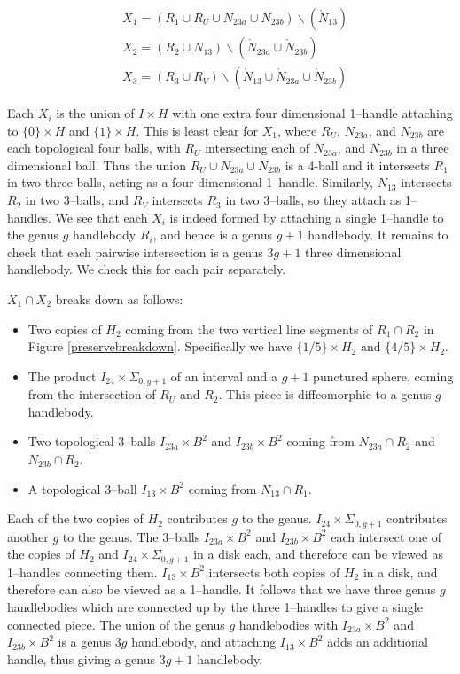 \documentclass[12pt]{amsart}
\theoremstyle{definition}
\theoremstyle{remark}
\begin{document}
\begin{align*}
&X_1 = (R_1 \cup R_U \cup N_{23a} \cup N_{23b}) \backslash (\mathring N_{13}) \\
&X_2 = (R_2 \cup N_{13}) \backslash (\mathring N_{23a} \cup \mathring N_{23b}) \\
&X_3 = (R_3 \cup R_V) \backslash (\mathring N_{13} \cup \mathring N_{23a} \cup \mathring N_{23b}) 
\end{align*}

Each $X_i$ is the union of $I \times H$ with one extra four dimensional 1--handle attaching to $\{0\} \times H$ and $\{1\} \times H$.  This is least clear for $X_1$, where $R_U$, $N_{23a}$, and $N_{23b}$ are each topological four balls, with $R_U$ intersecting each of $N_{23a}$, and $N_{23b}$ in a three dimensional ball.  Thus the union $R_U \cup N_{23a} \cup N_{23b}$ is a 4-ball and it intersects $R_1$ in two three balls, acting as a four dimensional 1--handle.  Similarly, $N_{13}$ intersects $R_2$ in two 3--balls, and $R_V$ intersects $R_3$ in two 3--balls, so they attach as 1--handles.   We see that each $X_i$ is indeed formed by attaching a single 1--handle to the genus $g$ handlebody $R_i$, and hence is a genus $g+1$ handlebody.  It remains to check that each pairwise intersection is a genus $3g+1$ three dimensional handlebody.  We check this for each pair separately.

$X_1 \cap X_2$ breaks down as follows:

\begin{itemize}
\item Two copies of $H_2$ coming from the two vertical line segments of $R_1 \cap R_2$ in Figure \ref{preservebreakdown}.  Specifically we have $\{1/5\} \times H_2$ and $\{4/5\} \times H_2$.
\item The product $I_{24} \times \Sigma_{0,g+1}$ of an interval and a $g+1$ punctured sphere, coming from the intersection of $R_U$ and $R_2$.  This piece is diffeomorphic to a genus $g$ handlebody.
\item Two topological 3--balls $I_{23a} \times B^2$ and $I_{23b} \times B^2$ coming from $N_{23a} \cap R_2$ and $N_{23b} \cap R_2$.
\item A topological 3--ball $I_{13} \times B^2$ coming from $N_{13} \cap R_1$.
\end{itemize}

Each of the two copies of $H_2$ contributes $g$ to the genus.  $I_{24} \times \Sigma_{0,g+1}$ contributes another $g$ to the genus.  The 3--balls $I_{23a} \times B^2$ and $I_{23b} \times B^2$ each intersect one of the copies of $H_2$ and $I_{24} \times \Sigma_{0,g+1}$ in a disk each, and therefore can be viewed as 1--handles connecting them.  $I_{13} \times B^2$ intersects both copies of $H_2$ in a disk, and therefore can also be viewed as a 1--handle.  It follows that we have three genus $g$ handlebodies which are connected up by the three 1--handles to give a single connected piece.  The union of the genus $g$ handlebodies with $I_{23a} \times B^2$  and $I_{23b} \times B^2$ is a genus $3g$ handlebody, and attaching $I_{13} \times B^2$ adds an additional handle, thus giving a genus $3g+1$ handlebody.
\end{document}
